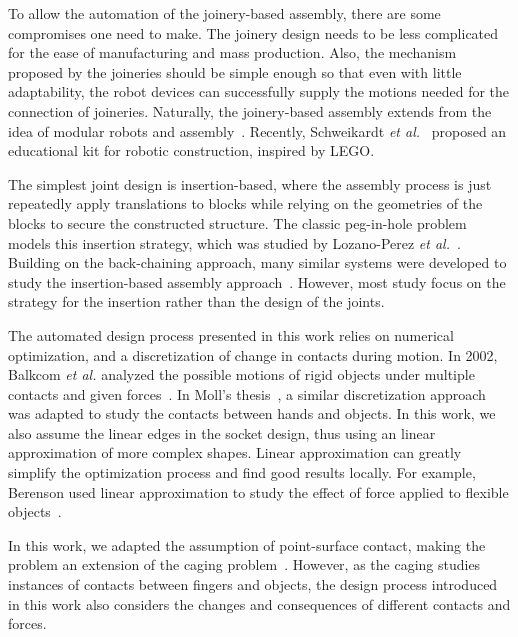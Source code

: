 \documentclass[letterpaper, 10 pt, conference]{ieeeconf}
\begin{document}
To allow the automation of the joinery-based assembly, there are some compromises one need to make. The joinery design needs to be less complicated for the ease of manufacturing and mass production. Also, the mechanism proposed by the joineries should be simple enough so that even with little adaptability, the robot devices can successfully supply the motions needed for the connection of joineries. Naturally, the joinery-based assembly extends from the idea of modular robots and assembly~\cite{rus2001crystalline, white2005three, romanishin2013m, daudelin2017integrated}. Recently, Schweikardt {\em et al.}~\cite{schweikardt2006roblocks} proposed an educational kit for robotic construction, inspired by LEGO. 

The simplest joint design is insertion-based, where the assembly process is just repeatedly apply translations to blocks while relying on the geometries of the blocks to secure the constructed structure. The classic peg-in-hole problem models this insertion strategy, which was studied by Lozano-Perez {\em et al.}~\cite{Lozano-Perez1984}. Building on the back-chaining approach, many similar systems were developed to study the insertion-based assembly approach~\cite{Mason86, Bruyninckx95, ZhangZOH04}. However, most study focus on the strategy for the insertion rather than the design of the joints. 

The automated design process presented in this work relies on numerical optimization, and a discretization of change in contacts during motion. In 2002, Balkcom {\em et al.} analyzed the possible motions of rigid objects under multiple contacts and given forces~\cite{Balkcom2002c}. In Moll's thesis~\cite{Moll2002}, a similar discretization approach was adapted to study the contacts between hands and objects. In this work, we also assume the linear edges in the socket design, thus using an linear approximation of more complex shapes. Linear approximation can greatly simplify the optimization process and find good results locally. For example, Berenson used linear approximation to study the effect of force applied to flexible objects~\cite{Berenson2013-deformable}. 

In this work, we adapted the assumption of point-surface contact, making the problem an extension of the caging problem~\cite{RimonBlack96, Rodriguez2010}. However, as the caging studies instances of contacts between fingers and objects, the design process introduced in this work also considers the changes and consequences of different contacts and forces. 
\end{document}
